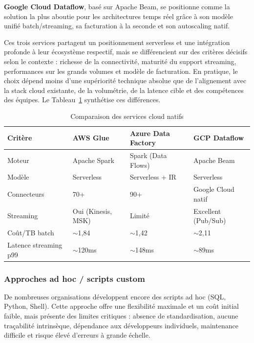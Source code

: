 \textbf{Google Cloud Dataflow}, basé sur Apache Beam, se positionne comme la
solution la plus aboutie pour les architectures temps réel grâce à son modèle
unifié batch/streaming, sa facturation à la seconde et son autoscaling natif.

Ces trois services partagent un positionnement serverless et une intégration
profonde à leur écosystème respectif, mais se différencient sur des critères
décisifs selon le contexte : richesse de la connectivité, maturité du support
streaming, performances sur les grands volumes et modèle de facturation. En
pratique, le choix dépend moins d'une supériorité technique absolue que de
l'alignement avec la stack cloud existante, de la volumétrie, de la latence
cible et des compétences des équipes. Le
Tableau~\ref{tab:cloud-services-comparison} synthétise ces différences.




\begin{table}[htbp]
\centering
\caption{Comparaison des services cloud natifs}
\label{tab:cloud-services-comparison}
\begin{tabularx}{\textwidth}{lXXX}
\toprule
\textbf{Critère} & \textbf{AWS Glue} & \textbf{Azure Data Factory} & \textbf{GCP Dataflow} \\
\midrule
Moteur & Apache Spark & Spark (Data Flows) & Apache Beam \\
\addlinespace
Modèle & Serverless & Serverless + IR & Serverless \\
\addlinespace
Connecteurs & 70+ & 90+ & Google Cloud natif \\
\addlinespace
Streaming & Oui (Kinesis, MSK) & Limité & Excellent (Pub/Sub) \\
\addlinespace
Coût/TB batch & $\sim$1,84 & $\sim$1,42 & $\sim$2,11 \\
\addlinespace
Latence streaming p99 & $\sim$120ms & $\sim$148ms & $\sim$89ms \\
\bottomrule
\end{tabularx}
\end{table}


\subsubsection{Approches ad hoc / scripts custom}
\label{subsubsec:scripts-custom}

De nombreuses organisations développent encore des scripts ad hoc (SQL, Python,
Shell). Cette approche offre une flexibilité maximale et un coût initial faible,
mais présente des limites critiques : absence de standardisation, aucune
traçabilité intrinsèque, dépendance aux développeurs individuels, maintenance
difficile et risque élevé d'erreurs à grande échelle.

